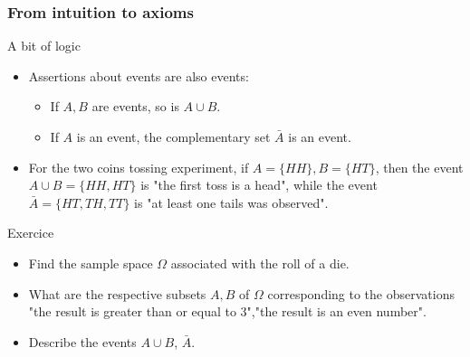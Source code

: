 \begin{frame}
    \frametitle{From intuition to axioms}
\begin{block}{A bit of logic}
    \begin{itemize}
        \item<+-> Assertions about events are also events:
        \begin{itemize}
            \item<+-> If $A,B$ are events, so is $A \cup B.$
            \item<+-> If $A$ is an event, the complementary set $\bar{A}$ is an event.
        \end{itemize}
        \item<+-> For the two coins tossing experiment, if $A=\{HH\},B=\{HT\}$, then
         the event $A \cup B = \{HH, HT\}$ is "the first toss is a head", while the event
        $\bar{A}=\{HT,TH,TT\}$ is "at least one tails was observed".
    \end{itemize}
\end{block}
\begin{block}{Exercice}
    \begin{itemize}
        \item<+-> Find the sample space $\Omega$ associated with the roll of a die.
        \item<+-> What are the respective subsets $A,B$ of $\Omega$ corresponding to the observations
        "the result is greater than or equal to 3","the result is an even number".
        \item<+-> Describe the events $A\cup B$, $\bar{A}.$
    \end{itemize}
\end{block}
\end{frame}
